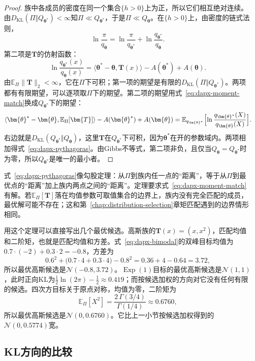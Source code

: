 \begin{proof}
族中各成员的密度在同一个集合$\{h>0\}$上为正，所以它们相互绝对连续。由$D_{\mathrm{KL}}(\Pi\Vert Q_{\bm{\theta}^{*}})<\infty$知$\Pi\ll Q_{\bm{\theta}^{*}}$，于是$\Pi\ll Q_{\bm{\theta}}$。在$\{h>0\}$上，由密度的链式法则，
\[
 \ln\frac{\pi}{q_{\bm{\theta}}}=\ln\frac{\pi}{q_{\bm{\theta}^{*}}}+\ln\frac{q_{\bm{\theta}^{*}}}{q_{\bm{\theta}}} .
\]
第二项是$\bm{T}$的仿射函数：
\[
 \ln\frac{q_{\bm{\theta}^{*}}(x)}{q_{\bm{\theta}}(x)}=\langle\bm{\theta}^{*}-\bm{\theta},\bm{T}(x)\rangle-A(\bm{\theta}^{*})+A(\bm{\theta}) .
\]
由$\mathbb{E}_{\Pi}\lVert\bm{T}\rVert_2<\infty$，它在$\Pi$下可积；第一项的期望是有限的$D_{\mathrm{KL}}(\Pi\Vert Q_{\bm{\theta}^{*}})$。两项都有有限期望，可以逐项取$\Pi$下的期望。第二项的期望用式~\eqref{eq:dapx-moment-match}换成$Q_{\bm{\theta}^{*}}$下的期望：
\[
 \langle\bm{\theta}^{*}-\bm{\theta},\mathbb{E}_{\Pi}[\bm{T}]\rangle-A(\bm{\theta}^{*})+A(\bm{\theta})
 =\mathbb{E}_{q_{\bm{\theta}^{*}}}\Bigl[\ln\frac{q_{\bm{\theta}^{*}}(X)}{q_{\bm{\theta}}(X)}\Bigr] .
\]
右边就是$D_{\mathrm{KL}}(Q_{\bm{\theta}^{*}}\Vert Q_{\bm{\theta}})$，这里$\bm{T}$在$Q_{\bm{\theta}^{*}}$下可积，因为$\bm{\theta}^{*}$在开的参数域内。两项相加得式~\eqref{eq:dapx-pythagoras}。由Gibbs不等式，第二项非负，且仅当$Q_{\bm{\theta}}=Q_{\bm{\theta}^{*}}$时为零，所以$Q_{\bm{\theta}^{*}}$是唯一的最小者。
\end{proof}

式~\eqref{eq:dapx-pythagoras}像勾股定理：从$\Pi$到族内任一点的“距离”，等于从$\Pi$到最优点的“距离”加上族内两点之间的“距离”。定理要求式~\eqref{eq:dapx-moment-match}有解。若$\mathbb{E}_{\Pi}[\bm{T}]$落在均值参数可取值集合的边界上，族内没有完全匹配的成员，最优解可能不存在；这和第~\ref{chap:distribution-selection}章矩匹配遇到的边界情形相同。

用这个定理可以直接写出几个最优候选。高斯族的$\bm{T}(x)=(x,x^{2})$，匹配均值和二阶矩，也就是匹配均值和方差。式~\eqref{eq:dapx-bimodal}的双峰目标均值为$0.7\cdot(-2)+0.3\cdot2=-0.8$，方差为
\[
 0.6^{2}+\bigl(0.7\cdot4+0.3\cdot4\bigr)-0.8^{2}=0.36+4-0.64=3.72 ,
\]
所以最优高斯候选是$\mathcal{N}(-0.8,3.72)$。$\operatorname{Exp}(1)$目标的最优高斯候选是$\mathcal{N}(1,1)$，此时正向KL为$\tfrac12\ln(2\pi)-\tfrac12\approx0.419$；而按候选加权的方向对它没有任何有限的候选。四次方目标关于原点对称，均值为零，二阶矩为
\[
 \mathbb{E}_{\Pi}[X^{2}]=\frac{2\,\Gamma(3/4)}{\Gamma(1/4)}\approx0.6760 ,
\]
所以最优高斯候选是$\mathcal{N}(0,0.6760)$。它比上一小节按候选加权得到的$\mathcal{N}(0,0.5774)$宽。

\subsection{KL方向的比较}
\label{sec:dapx-direction-compare}

